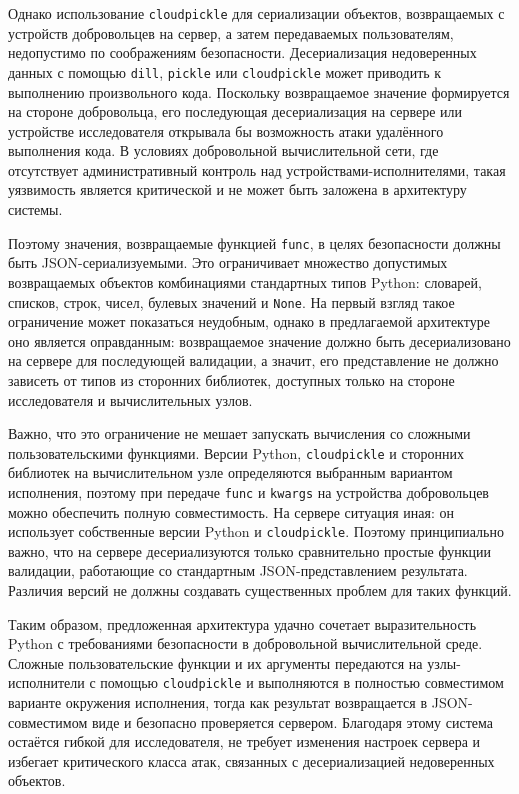 \documentclass[a4paper,12pt]{extarticle}
\begin{document}
Однако использование \texttt{cloudpickle} для сериализации объектов, возвращаемых с \newline устройств добровольцев на сервер, а затем передаваемых пользователям, недопустимо по соображениям безопасности.
Десериализация недоверенных данных с помощью \texttt{dill}, \texttt{pickle} или \texttt{cloudpickle} может приводить к выполнению произвольного кода.
Поскольку возвращаемое значение формируется на стороне добровольца, его последующая десериализация на сервере или устройстве исследователя открывала бы возможность атаки удалённого выполнения кода.
В условиях добровольной вычислительной сети, где отсутствует административный контроль над устройствами-исполнителями, такая уязвимость является критической и не может быть заложена в архитектуру системы.

Поэтому значения, возвращаемые функцией
\texttt{func}, в целях безопасности должны быть JSON-сериализуемыми.
Это ограничивает множество допустимых возвращаемых объектов комбинациями стандартных типов Python: словарей, списков, строк, чисел, булевых значений и \texttt{None}.
На первый взгляд такое ограничение может показаться неудобным, однако в предлагаемой архитектуре оно является оправданным: возвращаемое значение должно быть десериализовано на сервере для последующей валидации, а значит, его представление не должно зависеть от типов из сторонних библиотек, доступных только на стороне исследователя и вычислительных узлов.

Важно, что это ограничение не мешает запускать вычисления со сложными пользовательскими функциями.
Версии Python, \texttt{cloudpickle} и сторонних библиотек на вычислительном узле определяются выбранным вариантом исполнения, поэтому при передаче \texttt{func} и \texttt{kwargs} на устройства добровольцев можно обеспечить полную совместимость.
На сервере ситуация иная: он использует собственные версии Python и \texttt{cloudpickle}.
Поэтому принципиально важно, что на сервере десериализуются только сравнительно простые функции валидации, работающие со стандартным JSON-представлением результата.
Различия версий не должны создавать существенных проблем для таких функций.

Таким образом, предложенная архитектура удачно сочетает выразительность Python с требованиями безопасности в добровольной вычислительной среде.
Сложные пользовательские функции и их аргументы передаются на узлы-исполнители с помощью \texttt{cloudpickle} и выполняются в полностью совместимом варианте окружения исполнения, тогда как результат возвращается в JSON-совместимом виде и безопасно проверяется сервером.
Благодаря этому система остаётся гибкой для исследователя, не требует изменения настроек сервера и избегает критического класса атак, связанных с десериализацией недоверенных объектов.
\end{document}
